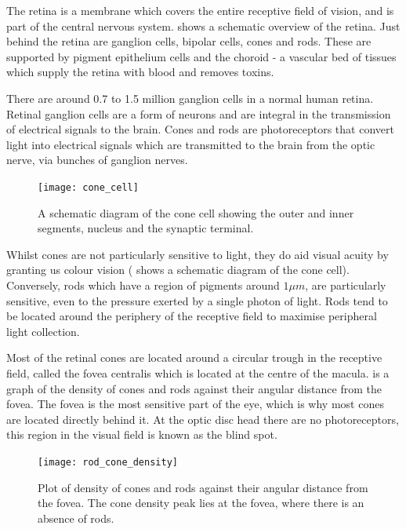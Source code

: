 The retina is a membrane which covers the entire receptive field of
vision, and is part of the central nervous system.\cite{rogers1983neurite}
 shows a schematic overview of the retina. Just behind the
retina are ganglion cells, bipolar cells, cones and rods. These are supported
by pigment epithelium cells and the choroid - a vascular bed of tissues which
supply the retina with blood and removes toxins. \cite{lutty1996localization} 

There are around 0.7 to 1.5 million ganglion cells in a normal human retina.
\cite{curcio1990topography} Retinal ganglion cells are a form of neurons
and are integral in the transmission of electrical signals to the brain.
\cite{meyer1995characterization} Cones and rods are photoreceptors
that convert light into electrical signals which are transmitted to the
brain from the optic nerve, via bunches of ganglion nerves.

\begin{figure}[H]
\centering
  \texttt{[image: cone\_cell]}
\caption{A schematic diagram of the cone cell showing the outer and inner
segments, nucleus and the synaptic terminal.\cite{wikicone}}
\label{fig:cone}
\end{figure}

Whilst cones are not particularly sensitive to light, they do aid visual
acuity by granting us colour vision ( shows a schematic
diagram of the cone cell).\cite{bowmaker1980visual} Conversely, rods
which have a region of pigments around $1\mu{m}$, are particularly
sensitive, even to the pressure exerted by a single photon of light.
Rods tend to be located around the periphery of the receptive field to
maximise peripheral light collection.
\cite{liebman1964sensitive,baylor1979responses}

Most of the retinal cones are located around a circular trough in the
receptive field, called the fovea centralis which is located at the centre
of the macula.\cite{hendrickson1994primate}
 is a graph of the density of cones and rods
against their angular distance from the fovea. The fovea is the most
sensitive part of the eye, which is why most cones are located directly
behind it. At the optic disc head there are no photoreceptors, this region
in the visual field is known as the blind spot.

\begin{figure}[H]
\centering
  \texttt{[image: rod\_cone\_density]}
\caption{Plot of density of cones and rods against their angular distance from
the fovea. The cone density peak lies at the fovea, where there is an absence
of rods.}
\label{fig:rod_cone_density}
\end{figure}

